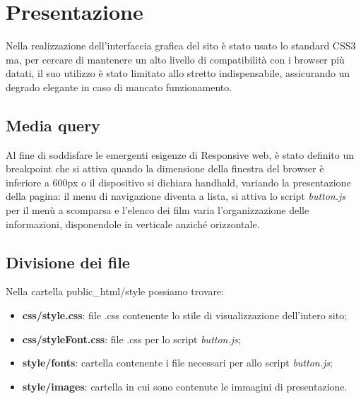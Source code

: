 \documentclass[../Relazione.tex]{subfiles}
\begin{document}
\section{Presentazione}

Nella realizzazione dell'interfaccia grafica del sito è stato usato lo standard CSS3 ma, per cercare di mantenere un alto livello di compatibilità con i browser più datati, il suo utilizzo è stato limitato allo stretto indispensabile, assicurando un degrado elegante in caso di mancato funzionamento.

\subsection{Media query}

Al fine di soddisfare le emergenti esigenze di Responsive web, è stato definito un breakpoint che si attiva quando la dimensione della finestra del browser è inferiore a 600px o il dispositivo si dichiara handhald, variando la presentazione della pagina: il menu di navigazione diventa a lista, si attiva lo script \textit{button.js} per il menù a scomparsa e l'elenco dei film varia l'organizzazione delle informazioni, disponendole in verticale anziché orizzontale.

\subsection{Divisione dei file}
Nella cartella public\_html/style possiamo trovare:
\begin{itemize}
\item \textbf{css/style.css}: file .css contenente lo stile di visualizzazione dell'intero sito;
\item \textbf{css/styleFont.css}: file .css per lo script \textit{button.js};
\item \textbf{style/fonts}: cartella contenente i file necessari per allo script \textit{button.js};
\item \textbf{style/images}: cartella in cui sono contenute le immagini di presentazione.
\end{itemize}
			
\end{document}
